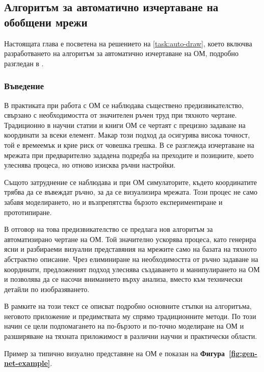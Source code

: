 \subsection{Алгоритъм за автоматично изчертаване на обобщени мрежи}
\label{sec:auto-drawing}

\hspace*{2.5em}Настоящата глава е посветена на решението на \ref{task:auto-draw}, което включва разработването на алгоритъм за автоматично изчертаване на ОМ, подробно разгледан в \cite{DimitrievTerziev}.

\subsubsection{Въведение}
\hspace*{2.5em}В практиката при работа с ОМ се наблюдава съществено предизвикателство, свързано с необходимостта от значителен ръчен труд при тяхното чертане. Традиционно в научни статии и книги ОМ се чертаят с прецизно задаване на координати за всеки елемент. Макар този подход да осигурява висока точност, той е времеемък и крие риск от човешка грешка. В \cite{IkonomovGNDraw} се разглежда изчертаване на мрежата при предварително зададена подредба на преходите и позициите, което улеснява процеса, но отново изисква ръчни настройки.

Същото затруднение се наблюдава и при ОМ симулаторите, където координатите трябва да се въвеждат ръчно, за да се визуализира мрежата. Този процес не само забавя моделирането, но и възпрепятства бързото експериментиране и прототипиране.

В отговор на това предизвикателство се предлага нов алгоритъм за автоматизирано чертане на ОМ. Той значително ускорява процеса, като генерира ясни и разбираеми визуални представяния на мрежите само на базата на тяхното абстрактно описание. Чрез елиминиране на необходимостта от ръчно задаване на координати, предложеният подход улеснява създаването и манипулирането на ОМ и позволява да се насочи вниманието върху анализа, вместо към технически детайли по изобразяването.

В рамките на този текст се описват подробно основните стъпки на алгоритъма, неговото приложение и предимствата му спрямо традиционните методи. По този начин се цели подпомагането на по-бързото и по-точно моделиране на ОМ и разширяване на тяхната приложимост в различни научни и практически области.

Пример за типично визуално представяне на ОМ е показан на \textbf{Фигура~\ref{fig:gen-net-example}}.


